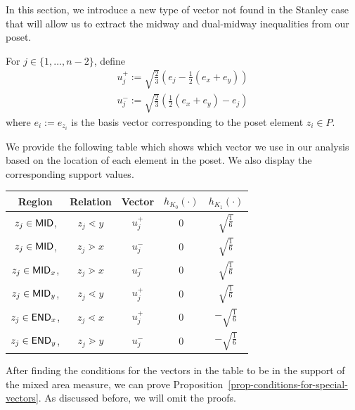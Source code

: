 \documentclass{puthesis-UG}
\begin{document}
In this section, we introduce a new type of vector not found in the Stanley case that will allow us to extract the midway and dual-midway inequalities from our poset.

\begin{defn} \label{special-vectors}
    For $j \in \{1, \ldots, n-2\}$, define 
    \begin{align*}
        u_j^+ := \sqrt{\frac{2}{3}} \left ( e_j - \frac{1}{2}(e_x + e_y) \right ) \\
        u_j^- := \sqrt{\frac{2}{3}} \left ( \frac{1}{2} (e_x + e_y) - e_j \right )
    \end{align*}
    where $e_i := e_{z_i}$ is the basis vector corresponding to the poset element $z_i \in P$.
\end{defn}

We provide the following table which shows which vector we use in our analysis based on the location of each element in the poset. We also display the corresponding support values. 

\begin{center}
    \begin{tabular}{||c c c c c||} 
         \hline
         Region & Relation & Vector & $h_{K_0}(\cdot)$ & $h_{K_1}(\cdot)$ \\ [0.5ex] 
         \hline\hline
         $z_j \in \mathsf{MID}$, & $z_j \lessdot y$ & $u_j^+$ & $0$ & $\sqrt{\frac{1}{6}}$ \\
         \hline
         $z_j \in \mathsf{MID}$, & $z_j \gtrdot x$ & $u_j^-$ & $0$ & $\sqrt{\frac{1}{6}}$ \\
         \hline
         $z_j \in \mathsf{MID}_x$, & $z_j \gtrdot x$ & $u_j^-$ & $0$ & $\sqrt{\frac{1}{6}}$\\
         \hline 
         $z_j \in \mathsf{MID}_y$, & $z_j \lessdot y$ & $u_j^+$ & $0$ & $\sqrt{\frac{1}{6}}$ \\
         \hline
         $z_j \in \mathsf{END}_x$, & $z_j \lessdot x$ & $u_j^+$ & $0$ & $-\sqrt{\frac{1}{6}}$ \\
         \hline 
         $z_j \in \mathsf{END}_y$, & $z_j \gtrdot y$ & $u_j^-$ & $0$ & $-\sqrt{\frac{1}{6}}$ \\
         \hline 
    \end{tabular}
\end{center}

After finding the conditions for the vectors in the table to be in the support of the mixed area measure, we can prove Proposition~\ref{prop-conditions-for-special-vectors}. As discussed before, we will omit the proofs.
\end{document}
